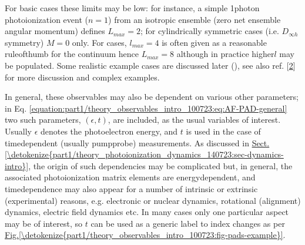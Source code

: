 \documentclass[letterpaper,table,10pt,english]{jupyterBook}
\begin{document}
\sphinxAtStartPar
For basic cases these limits may be low: for instance, a simple 1\sphinxhyphen{}photon photoionization event (\(n=1\)) from an isotropic ensemble (zero net ensemble angular momentum) defines \(L_{max}=2\); for cylindrically symmetric cases (i.e. \(D_{\infty h}\) symmetry) \(M=0\) only. For {\hyperref[\detokenize{backmatter/glossary:term-MF}]{}} cases, \(l_{max}=4\) is often given as a reasonable rule\sphinxhyphen{}of\sphinxhyphen{}thumb for the continuum \sphinxhyphen{} hence \(L_{max}=8\) \sphinxhyphen{} although in practice higher\sphinxhyphen{}\(l\) may be populated. Some realistic example cases are discussed later ({\hyperref[\detokenize{part2/extracting_matrix_elements_overview_270423:chpt-extracting-matrix-elements-overview}]{}}), see also ref. {[}\hyperlink{cite.backmatter/bibliography:id663}{2}{]} for more discussion and complex examples.

\sphinxAtStartPar
In general, these observables may also be dependent on various other parameters; in Eq. \eqref{equation:part1/theory_observables_intro_100723:eq:AF-PAD-general} two such parameters, \((\epsilon,t)\), are included, as the usual variables of interest. Usually \(\epsilon\) denotes the photoelectron energy, and \(t\) is used in the case of time\sphinxhyphen{}dependent (usually pump\sphinxhyphen{}probe) measurements. As discussed in \hyperref[\detokenize{part1/theory_photoionization_dynamics_140723:sec-dynamics-intro}]{Sect.\@ \ref{\detokenize{part1/theory_photoionization_dynamics_140723:sec-dynamics-intro}}}, the origin of such dependencies may be complicated but, in general, the associated photoionization matrix elements are energy\sphinxhyphen{}dependent, and time\sphinxhyphen{}dependence may also appear for a number of intrinsic or extrinsic (experimental) reasons, e.g. electronic or nuclear dynamics, rotational (alignment) dynamics, electric field dynamics etc. In many cases only one particular aspect may be of interest, so \(t\) can be used as a generic label to index changes as per \hyperref[\detokenize{part1/theory_observables_intro_100723:fig-pads-example}]{Fig.\@ \ref{\detokenize{part1/theory_observables_intro_100723:fig-pads-example}}}.
\end{document}
